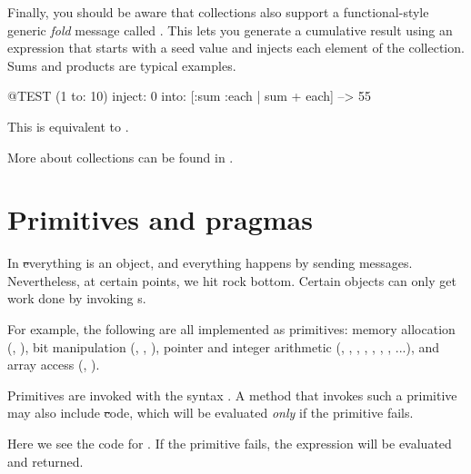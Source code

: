 \documentclass[a4paper,10pt,twoside]{book}
\begin{document}

Finally, you should be aware that collections also support a functional-style generic \emph{fold} message called .
This lets you generate a cumulative result using an expression that starts with a seed value and injects each element of the collection.
Sums and products are typical examples.

\begin{code}{@TEST}
(1 to: 10) inject: 0 into: [:sum :each | sum + each] --> 55
\end{code}

\noindent
This is equivalent to .

More about collections can be found in .

\section{Primitives and pragmas}

In \st everything is an object, and everything happens by sending messages.
Nevertheless, at certain points, we hit rock bottom.
Certain objects can only get work done by invoking  s.

For example, the following are all implemented as primitives:
memory allocation (, ),
bit manipulation (, , ),
pointer and integer arithmetic (\ct{+}, \ct{-},  \ct{<},  \ct{>}, \ct{*}, \ct{/ }, \ct{=}, \ct{==}...),
and array access (, ).

Primitives are invoked with the syntax .
A method that invokes such a primitive may also include \st code, which will be evaluated \emph{only} if the primitive fails.

Here we see the code for .
If the primitive fails, the expression  will be evaluated and returned.
\end{document}
